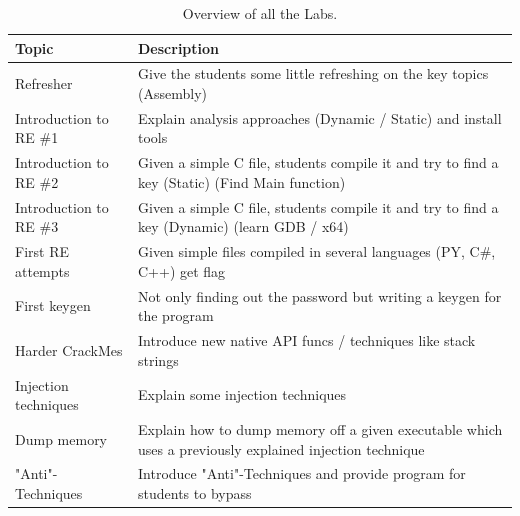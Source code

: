 \begin{center}
    \begin{table}[H]
        \centering
        \begin{tabular}{ |p{4.1cm}|p{10cm}| } 
            \hline
                Topic & 
                Description \\ [0.5ex] 
            \hline
            \hline
                Refresher & 
                Give the students some little refreshing on the key topics (Assembly)  \\ 
            \hline
                Introduction to RE \#1 & 
                Explain analysis approaches (Dynamic / Static) and install tools \\ 
            \hline
                Introduction to RE \#2 & 
                Given a simple C file, students compile it and try to find a key (Static) (Find Main function) \\ 
            \hline
                Introduction to RE \#3 & 
                Given a simple C file, students compile it and try to find a key (Dynamic) (learn GDB / x64) \\ 
            \hline
                First RE attempts & 
                Given simple files compiled in several languages (PY, C\#, C++) get flag \\ 
            \hline
                First keygen & 
                Not only finding out the password but writing a keygen for the program \\
            \hline
                Harder CrackMes & 
                Introduce new native API funcs / techniques like stack strings \\
            \hline
                Injection techniques & 
                Explain some injection techniques \\
            \hline
                Dump memory & 
                Explain how to dump memory off a given executable which uses a previously explained injection technique \\
            \hline
                "Anti"-Techniques & 
                Introduce "Anti"-Techniques and provide program for students to bypass \\
            \hline
        \end{tabular}
        \caption{Overview of all the Labs.}
    \end{table}
\end{center}